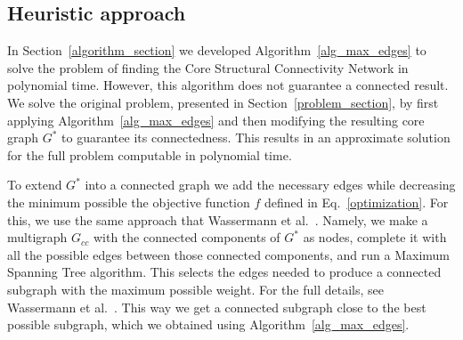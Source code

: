 \subsection{Heuristic approach}\label{heuristic}
In Section~\ref{algorithm_section} we developed  Algorithm~\ref{alg_max_edges} to solve the problem of finding the Core Structural Connectivity Network in polynomial time. However, this algorithm does not guarantee a connected result. We solve the original problem, presented in Section~\ref{problem_section}, by first applying Algorithm~\ref{alg_max_edges} and then modifying the resulting core graph $G^*$ to guarantee its connectedness. This results in an approximate solution for the full problem computable in polynomial time.

To extend $G^*$ into a connected graph we add the necessary edges while decreasing the minimum possible the objective function $f$ defined in Eq.~\ref{optimization}. For this, we use the same approach that Wassermann et al.~\cite{Wassermann2016}. Namely, we make a multigraph $G_{cc}$ with the connected components of $G^*$ as nodes, complete it with all the possible edges between those connected components, and run a Maximum Spanning Tree algorithm. This selects the edges needed to produce a connected subgraph with the maximum possible weight. For the full details, see Wassermann et al.~\cite{Wassermann2016}. This way we get a connected subgraph close to the best possible subgraph, which we obtained using Algorithm~\ref{alg_max_edges}.